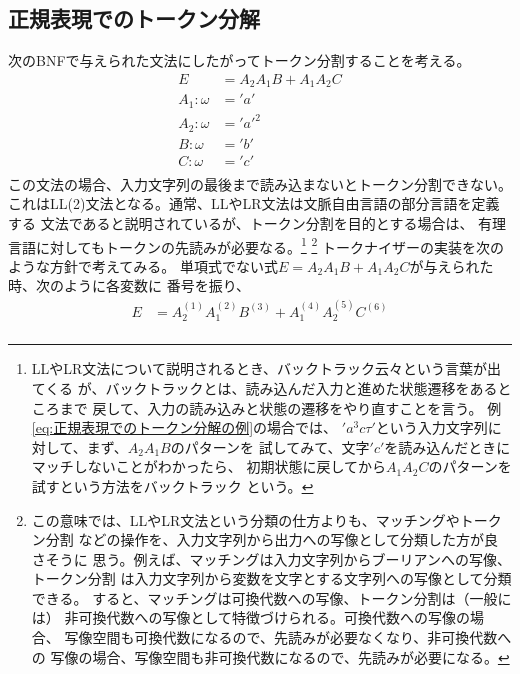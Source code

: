 {\subsection{正規表現でのトークン分解}\label{s2:正規表現でのトークン分解} %
	次のBNFで与えられた文法にしたがってトークン分割することを考える。
	\begin{equation}\label{eq:正規表現でのトークン分解の例}\begin{split}
		E &= A_2A_1B + A_1A_2C \\
		A_1:\omega &= 'a' \\
		A_2:\omega &= 'a'^2 \\
		B:\omega &= 'b' \\
		C:\omega &= 'c' \\
	\end{split}\end{equation}
	この文法の場合、入力文字列の最後まで読み込まないとトークン分割できない。
	これはLL(2)文法となる。通常、LLやLR文法は文脈自由言語の部分言語を定義する
	文法であると説明されているが、トークン分割を目的とする場合は、
	有理言語に対してもトークンの先読みが必要なる。\footnote{
		LLやLR文法について説明されるとき、バックトラック云々という言葉が出てくる
		が、バックトラックとは、読み込んだ入力と進めた状態遷移をあるところまで
		戻して、入力の読み込みと状態の遷移をやり直すことを言う。
		例\eqref{eq:正規表現でのトークン分解の例}の場合では、
		$'a^3c\tau'$という入力文字列に対して、まず、$A_2A_1B$のパターンを
		試してみて、文字$'c'$を読み込んだときにマッチしないことがわかったら、
		初期状態に戻してから$A_1A_2C$のパターンを試すという方法をバックトラック
		という。
	} \footnote{
		この意味では、LLやLR文法という分類の仕方よりも、マッチングやトークン分割
		などの操作を、入力文字列から出力への写像として分類した方が良さそうに
		思う。例えば、マッチングは入力文字列からブーリアンへの写像、トークン分割
		は入力文字列から変数を文字とする文字列への写像として分類できる。
		すると、マッチングは可換代数への写像、トークン分割は（一般には）
		非可換代数への写像として特徴づけられる。可換代数への写像の場合、
		写像空間も可換代数になるので、先読みが必要なくなり、非可換代数への
		写像の場合、写像空間も非可換代数になるので、先読みが必要になる。
	}
	トークナイザーの実装を次のような方針で考えてみる。
	単項式でない式$E=A_2A_1B + A_1A_2C$が与えられた時、次のように各変数に
	番号を振り、
	\begin{equation*}\begin{split}
		E &= A_2^{(1)}A_1^{(2)}B^{(3)} + A_1^{(4)}A_2^{(5)}C^{(6)} \\
	\end{split}\end{equation*}
}
